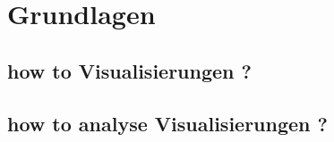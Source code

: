 \chapter[Grundlagen]{Grundlagen}
\label{chap:literature}

\section[how to Visualisierungen ?]{how to Visualisierungen ?}
\section[how to analyse Visualisierungen ?]{how to analyse Visualisierungen ?}
